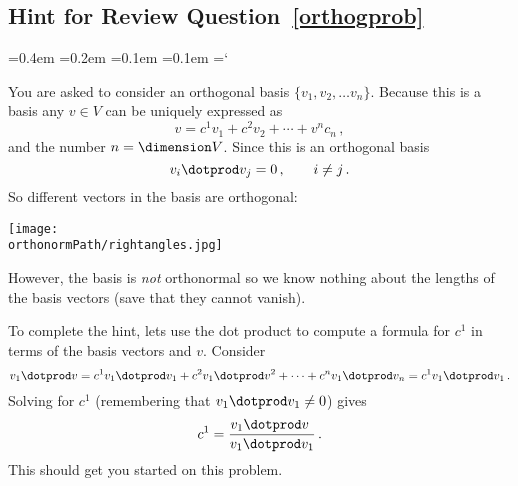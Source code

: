 
\subsection*{Hint for Review  Question~\ref{orthogprob}}

{\ttfamily
{}\font=0.4em
\font=0.2em
\font=0.1em
\font=0.1em
\hyphenchar\font=`\-


You are asked to consider an orthogonal basis $\{v_1,v_2,\ldots v_n\}$.
Because this is a basis any $v\in V$ can be uniquely expressed as
\[
v=c^1 v_1 + c^2 v_2 +\cdots +v^n c_n\, ,
\]
and the number $n=\dimension V$. Since this is an orthogonal basis
\[
v_i\dotprod v_j =0 \, ,\qquad i\neq j\, .
\]
So different vectors in the basis are orthogonal:
\begin{center}
\texttt{[image: \\orthonormPath/rightangles.jpg]}
\end{center}
However, the basis is {\itshape not} orthonormal so we know nothing about the
lengths of the basis vectors (save that they cannot vanish). 

To complete the hint, lets use the dot product to compute a formula for $c^1$ in terms of the basis vectors and $v$. Consider
\[
v_1\dotprod v = c^1 v_1\dotprod v_1 + c^2 v_1\dotprod v^2 +\cdots + c^n v_1\dotprod v_n=c^1 v_1\dotprod v_1\, .
\]
Solving for $c^1$ (remembering that $v_1\dotprod v_1\neq 0$) gives
\[
c^1 = \frac{v_1\dotprod v\ }{v_1\dotprod v_1}\, .
\]
This should get you started on this problem.

} %

